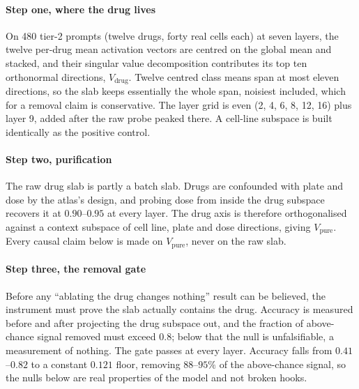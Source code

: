 \paragraph{Step one, where the drug lives} On \num{480} tier-2 prompts (twelve
drugs, forty real cells each) at seven layers, the twelve per-drug mean
activation vectors are centred on the global mean and stacked, and their singular
value decomposition contributes its top ten orthonormal directions,
$V_{\textrm{drug}}$. Twelve centred class means span at most eleven directions,
so the slab keeps essentially the whole span, noisiest included, which for a
removal claim is conservative. The layer grid is even (2, 4, 6, 8, 12, 16) plus
layer 9, added after the raw probe peaked there. A cell-line subspace is built
identically as the positive control.

\paragraph{Step two, purification} The raw drug slab is partly a batch slab.
Drugs are confounded with plate and dose by the atlas's design, and probing dose
from inside the drug subspace recovers it at $0.90$--$0.95$ at every layer. The
drug axis is therefore orthogonalised against a context subspace of cell line,
plate and dose directions, giving $V_{\textrm{pure}}$. Every causal claim below
is made on $V_{\textrm{pure}}$, never on the raw slab.

\paragraph{Step three, the removal gate} Before any ``ablating the drug changes
nothing'' result can be believed, the instrument must prove the slab actually
contains the drug. Accuracy is measured before and after projecting the drug
subspace out, and the fraction of above-chance signal removed must exceed $0.8$;
below that the null is unfalsifiable, a measurement of nothing. The gate passes
at every layer. Accuracy falls from $0.41$--$0.82$ to a constant $0.121$ floor,
removing $88$--$95\%$ of the above-chance signal, so the nulls below are real
properties of the model and not broken hooks.

